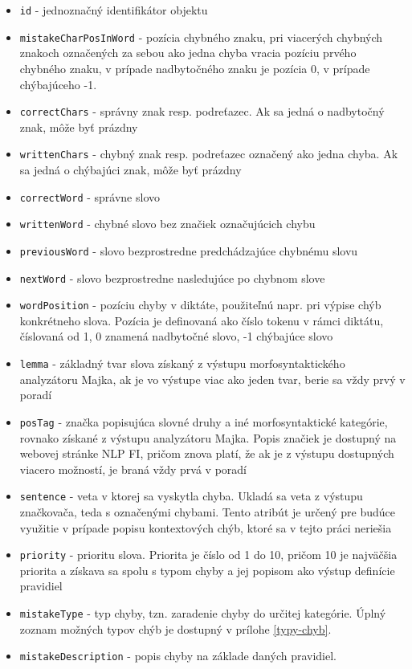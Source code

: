 \documentclass[12pt,oneside]{fithesis2}
\begin{document}
      \begin{itemize}
	\item \texttt{id} - jednoznačný identifikátor objektu
	\item \texttt{mistakeCharPosInWord} - pozícia chybného znaku, pri viacerých chybných znakoch označených za sebou ako jedna chyba vracia pozíciu prvého chybného znaku, v prípade nadbytočného znaku je pozícia 0, v prípade chýbajúceho -1.
	\item \texttt{correctChars} - správny znak resp. podreťazec. Ak sa jedná o nadbytočný znak, môže byť prázdny
	\item \texttt{writtenChars} - chybný znak resp. podreťazec označený ako jedna chyba. Ak sa jedná o chýbajúci znak, môže byť prázdny
	\item \texttt{correctWord} - správne slovo
	\item \texttt{writtenWord} - chybné slovo bez značiek označujúcich chybu
	\item \texttt{previousWord} - slovo bezprostredne predchádzajúce chybnému slovu
	\item \texttt{nextWord} - slovo bezprostredne nasledujúce po chybnom slove
	\item \texttt{wordPosition} - pozíciu chyby v diktáte, použiteľnú napr. pri výpise chýb konkrétneho slova. Pozícia je definovaná ako číslo tokenu v rámci diktátu, číslovaná od 1, 0 znamená nadbytočné slovo, -1 chýbajúce slovo
	\item \texttt{lemma} - základný tvar slova získaný z výstupu morfosyntaktického analyzátoru Majka\cite{majka}, ak je vo výstupe viac ako jeden tvar, berie sa vždy prvý v poradí
	\item \texttt{posTag} - značka popisujúca slovné druhy a iné morfosyntaktické kategórie, rovnako získané z výstupu analyzátoru Majka. Popis značiek je dostupný na webovej stránke NLP FI\cite{nlpfi}, pričom znova platí, že ak je z výstupu dostupných viacero možností, je braná vždy prvá v poradí
	\item \texttt{sentence} - veta v ktorej sa vyskytla chyba. Ukladá sa veta z výstupu značkovača, teda s označenými chybami. Tento atribút je určený pre budúce využitie v prípade popisu kontextových chýb, ktoré sa v tejto práci neriešia
	\item \texttt{priority} - prioritu slova. Priorita je číslo od 1 do 10, pričom 10 je najväčšia priorita a získava sa spolu s typom chyby a jej popisom ako výstup definície pravidiel
	\item \texttt{mistakeType} - typ chyby, tzn. zaradenie chyby do určitej kategórie. Úplný zoznam možných typov chýb je dostupný v prílohe \ref{typy-chyb}.
	\item \texttt{mistakeDescription} - popis chyby na základe daných pravidiel.
\end{itemize}
\end{document}
